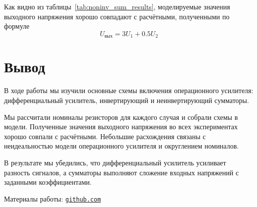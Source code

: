 \documentclass[a4paper,12pt]{article}
\begin{document}
	
	Как видно из таблицы~\ref{tab:noninv_sum_results}, моделируемые значения выходного напряжения хорошо совпадают с расчётными, полученными по формуле
	\[
	U_{\text{вых}} = 3U_1 + 0.5U_2
	\]
	
	
	\newpage
	\section{Вывод}
	
	В ходе работы мы изучили основные схемы включения операционного усилителя: дифференциальный усилитель, инвертирующий и неинвертирующий сумматоры.
	
	Мы рассчитали номиналы резисторов для каждого случая и собрали схемы в модели. Полученные значения выходного напряжения во всех экспериментах хорошо совпали с расчётными. Небольшие расхождения связаны с неидеальностью модели операционного усилителя и округлением номиналов.
	
	В результате мы убедились, что дифференциальный усилитель усиливает разность сигналов, а сумматоры выполняют сложение входных напряжений с заданными коэффициентами.
	
	

	Материалы работы: \href{https://github.com/decadeos/ITMO/tree/master/3_course/EDCS/lab1}{\texttt{github.com}}
	
\end{document}
